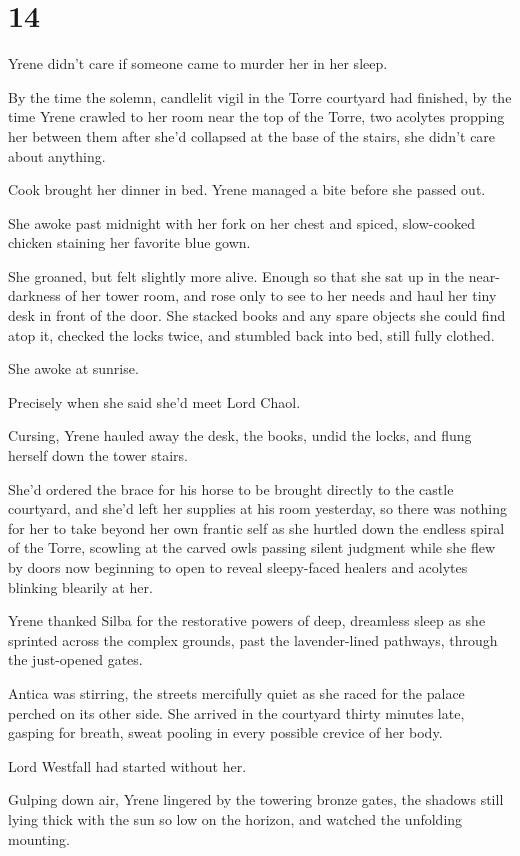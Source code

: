 
\chapter{14}

Yrene didn't care if someone came to murder her in her sleep.

By the time the solemn, candlelit vigil in the Torre courtyard had finished, by the time Yrene crawled to her room near the top of the Torre, two acolytes propping her between them after she'd collapsed at the base of the stairs, she didn't care about anything.

Cook brought her dinner in bed. Yrene managed a bite before she passed out.

She awoke past midnight with her fork on her chest and spiced, slow-cooked chicken staining her favorite blue gown.

She groaned, but felt slightly more alive. Enough so that she sat up in the near-darkness of her tower room, and rose only to see to her needs and haul her tiny desk in front of the door. She stacked books and any spare objects she could find atop it, checked the locks twice, and stumbled back into bed, still fully clothed.

She awoke at sunrise.

Precisely when she said she'd meet Lord Chaol.

Cursing, Yrene hauled away the desk, the books, undid the locks, and flung herself down the tower stairs.

She'd ordered the brace for his horse to be brought directly to the castle courtyard, and she'd left her supplies at his room yesterday, so there was nothing for her to take beyond her own frantic self as she hurtled down the endless spiral of the Torre, scowling at the carved owls passing silent judgment while she flew by doors now beginning to open to reveal sleepy-faced healers and acolytes blinking blearily at her.

Yrene thanked Silba for the restorative powers of deep, dreamless sleep as she sprinted across the complex grounds, past the lavender-lined pathways, through the just-opened gates.

Antica was stirring, the streets mercifully quiet as she raced for the palace perched on its other side. She arrived in the courtyard thirty minutes late, gasping for breath, sweat pooling in every possible crevice of her body.

Lord Westfall had started without her.

Gulping down air, Yrene lingered by the towering bronze gates, the shadows still lying thick with the sun so low on the horizon, and watched the unfolding mounting.

